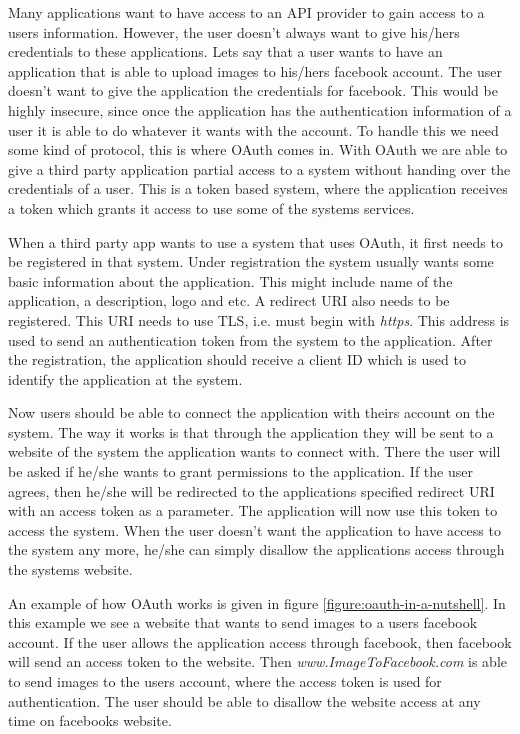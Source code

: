 Many applications want to have access to an API provider to gain access to a users information.
However, the user doesn't always want to give his/hers credentials to these applications.
Lets say that a user wants to have an application that is able to upload images to his/hers facebook account.
The user doesn't want to give the application the credentials for facebook.
This would be highly insecure, since once the application has the authentication information of a user it is able to do whatever it wants with the account.
To handle this we need some kind of protocol, this is where OAuth comes in.
With OAuth we are able to give a third party application partial access to a system without handing over the credentials of a user.
This is a token based system, where the application receives a token which grants it access to use some of the systems services.

When a third party app wants to use a system that uses OAuth, it first needs to be registered in that system.
Under registration the system usually wants some basic information about the application.
This might include name of the application, a description, logo and etc.
A redirect URI also needs to be registered.
This URI needs to use TLS, i.e. must begin with \textit{https}.
This address is used to send an authentication token from the system to the application.
After the registration, the application should receive a client ID which is used to identify the application at the system.

Now users should be able to connect the application with theirs account on the system.
The way it works is that through the application they will be sent to a website of the system the application wants to connect with.
There the user will be asked if he/she wants to grant permissions to the application.
If the user agrees, then he/she will be redirected to the applications specified redirect URI with an access token as a parameter.
The application will now use this token to access the system.
When the user doesn't want the application to have access to the system any more, he/she can simply disallow the applications access through the systems website.

An example of how OAuth works is given in figure \ref{figure:oauth-in-a-nutshell}.
In this example we see a website that wants to send images to a users facebook account.
If the user allows the application access through facebook, then facebook will send an access token to the website.
Then \textit{www.ImageToFacebook.com} is able to send images to the users account, where the access token is used for authentication.
The user should be able to disallow the website access at any time on facebooks website. \cite{OAuth}

